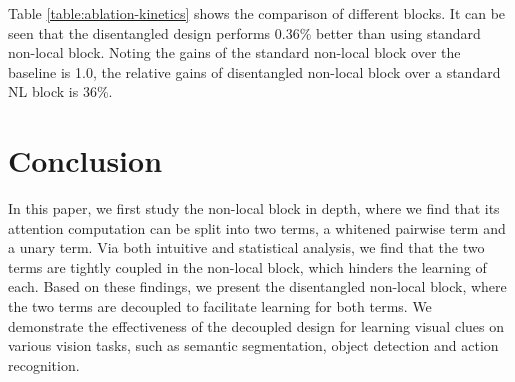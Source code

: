 \documentclass[runningheads]{llncs}
\begin{document}
Table \ref{table:ablation-kinetics} shows the comparison of different blocks. It can be seen that the disentangled design performs 0.36\% better than using standard non-local block. Noting the gains of the standard non-local block over the baseline is 1.0, the relative gains of disentangled non-local block over a standard NL block is 36\%.

\section{Conclusion}
In this paper, we first study the non-local block in depth, where we find that its attention computation can be split into two terms, a whitened pairwise term and a unary term. Via both intuitive and statistical analysis, we find that the two terms are tightly coupled in the non-local block, which hinders the learning of each. Based on these findings, we present the disentangled non-local block, where the two terms are decoupled to facilitate learning for both terms. We demonstrate the effectiveness of the decoupled design for learning visual clues on various vision tasks, such as semantic segmentation, object detection and action recognition.




\clearpage
\appendix

\begin{table}
    \centering
    \footnotesize
    \addtolength{\tabcolsep}{-0.5pt}
\caption{Results with more NL and DNL blocks based on Mask R-CNN, using R50 as backbone with FPN, for {object detection} and {instance segmentation} on COCO 2017 validation set}
\normalsize
\label{tab:ablation-coco}
\end{table}
\end{document}
